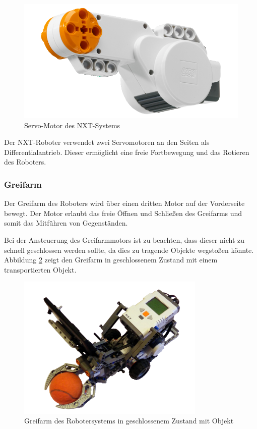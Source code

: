 \begin{figure}[h]
\centering
\includegraphics[width=\textwidth/3]{Bilder/Robot/motor}
\caption{Servo-Motor des NXT-Systems}
\label{fig:motor}
\end{figure}

Der NXT-Roboter verwendet zwei Servomotoren an den Seiten als Differentialantrieb. Dieser ermöglicht eine freie Fortbewegung und das Rotieren des Roboters. 

\subsubsection{Greifarm}
\label{sec:Greifarm}
Der Greifarm des Roboters wird über einen dritten Motor auf der Vorderseite bewegt. Der Motor erlaubt das freie Öffnen und Schließen des Greifarms und somit das Mitführen von Gegenständen. 

Bei der Ansteuerung des Greifarmmotors ist zu beachten, dass dieser nicht zu schnell geschlossen werden sollte, da dies zu tragende Objekte wegstoßen könnte. Abbildung \ref{fig:Greifarm} zeigt den Greifarm in geschlossenem Zustand mit einem transportierten Objekt.

\begin{figure}[h]
\centering
\includegraphics[width=0.8\textwidth]{Bilder/Robot/cleenr_with_object}
\caption[Greifarm des Robotersystems]{Greifarm des Robotersystems in geschlossenem Zustand mit Objekt}
\label{fig:Greifarm}
\end{figure}

